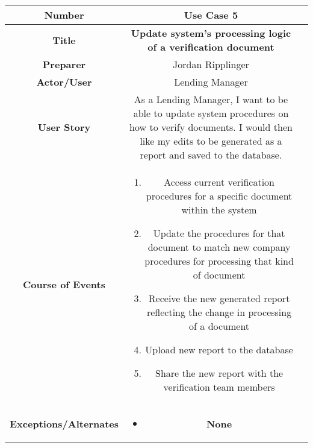 \begin{table}[H]
    \centering
    \begin{tabularx}{0.75\linewidth}{||Sc|X||}
        \hline
        \hline
        \textbf{Number} & \textbf{Use Case 5} \\
        \hline
        \textbf{Title} & \textbf{Update system's processing logic of a verification document} \\
        \hline
        \textbf{Preparer} & Jordan Ripplinger \\
        \hline
        \textbf{Actor/User} & Lending Manager \\
        \hline
        \textbf{User Story} &
        As a Lending Manager, I want to be able to update system procedures on how to verify documents. I would then like my edits to be generated as a report and saved to the database. \\
        \hline
        \textbf{Course of Events} &
        \begin{minipage}[l]{\linewidth}
            \begin{enumerate}[wide, labelindent=0pt]
                \item Access current verification procedures for a specific document within the system
                \item Update the procedures for that document to match new company procedures for processing that kind of document
                \item Receive the new generated report reflecting the change in processing of a document
                \item Upload new report to the database
                \item Share the new report with the verification team members
            \end{enumerate}
            \vspace{4pt}
        \end{minipage} \\
        \hline
        \textbf{Exceptions/Alternates} & 
        \begin{minipage}[l]{\linewidth}
            \vspace{2pt}
            \begin{itemize}[wide, labelindent=0pt]
                \item \textbf{None}
            \end{itemize}
        \end{minipage} \\
        \hline

\end{tabularx}
\end{table}
